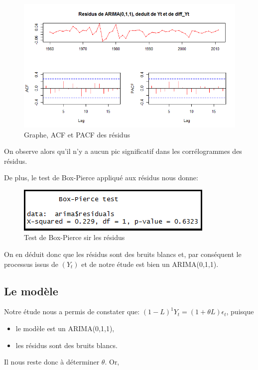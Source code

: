 \documentclass{article}
\begin{document}
\begin{figure}[h!]
\includegraphics[width=\linewidth]{images/Yt_residus.png}
\caption{Graphe, ACF et PACF des résidus}
\label{fig:Yt_residus}
\end{figure}

On observe alors qu'il n'y a aucun pic significatif dans les corrélogrammes des résidus.

De plus, le test de Box-Pierce appliqué aux résidus nous donne:

\begin{figure}[h!]
\includegraphics[width=\linewidth]{images/Yt_residus_bp.png}
\caption{Test de Box-Pierce sir les résidus}
\label{fig:Yt_residus_bp}
\end{figure}

On en déduit donc que les résidus sont des bruits blancs et, par conséquent le processus issus de $(Y_t)$ et de notre étude est bien un ARIMA(0,1,1).

\subsection{Le modèle}
Notre étude nous a permis de constater que: $(1-L)^1{Y_t}=(1+\theta{L})\epsilon_t$, puisque
\begin{itemize}
\item le modèle est un ARIMA(0,1,1),
\item les résidus sont des bruits blancs.
\end{itemize}
Il nous reste donc à déterminer $\theta$. Or,
\end{document}
